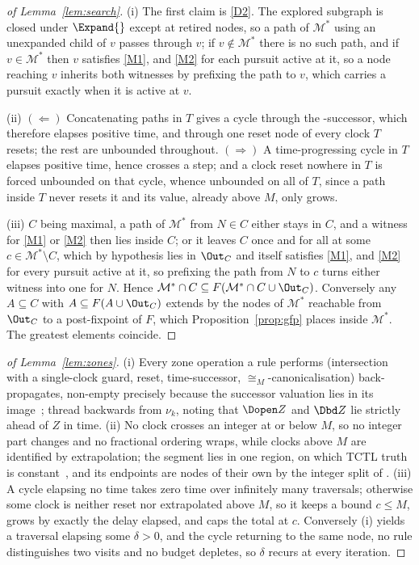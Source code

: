 \begin{proof}[of Lemma~\ref{lem:search}]
(i) The first claim is \ref{D2}. The explored subgraph is closed under $\Expand{}$ except at retired
nodes, so a path of $\mathcal M^{*}$ using an unexpanded child of $v$ passes through $v$; if
$v\notin\mathcal M^{*}$ there is no such path, and if $v\in\mathcal M^{*}$ then $v$ satisfies
\ref{M1}, and \ref{M2} for each pursuit active at it, so a node reaching $v$ inherits both witnesses
by prefixing the path to $v$, which carries a pursuit exactly when it is active at $v$.

(ii) $(\Leftarrow)$ Concatenating paths in $T$ gives a cycle through the -successor,
which therefore elapses positive time, and through one reset node of every clock $T$ resets; the rest
are unbounded throughout. $(\Rightarrow)$ A time-progressing cycle in $T$ elapses positive time,
hence crosses a  step; and a clock reset nowhere in $T$ is forced unbounded on that
cycle, whence unbounded on all of $T$, since a path inside $T$ never resets it and its value, already
above $M$, only grows.

(iii) $C$ being maximal, a path of $\mathcal M^{*}$ from $N\in C$ either stays in $C$, and a witness
for \ref{M1} or \ref{M2} then lies inside $C$; or it leaves $C$ once and for all at some
$c\in\mathcal M^{*}\setminus C$, which by hypothesis lies in $\Out_C$ and itself satisfies \ref{M1},
and \ref{M2} for every pursuit active at it, so prefixing the path from $N$ to $c$ turns either
witness into one for $N$. Hence $\mathcal M^{*}\cap C\subseteq F(\mathcal M^{*}\cap C\cup\Out_C)$.
Conversely any $A\subseteq C$ with $A\subseteq F(A\cup\Out_C)$ extends by the nodes of
$\mathcal M^{*}$ reachable from $\Out_C$ to a post-fixpoint of $F$, which Proposition~\ref{prop:gfp}
places inside $\mathcal M^{*}$. The greatest elements coincide.
\end{proof}

\begin{proof}[of Lemma~\ref{lem:zones}]
(i) Every zone operation a rule performs (intersection with a single-clock guard, reset,
time-successor, $\cong_M$-canonicalisation) back-propagates, non-empty precisely because the
successor valuation lies in its image~\cite{Bouyer05TimedAutomata}; thread backwards from $\nu_k$,
noting that $\Dopen Z$ and $\Dbd Z$ lie strictly ahead of $Z$ in time. (ii) No clock crosses an
integer at or below $M$, so no integer part changes and no fractional ordering wraps, while clocks
above $M$ are identified by extrapolation; the segment lies in one region, on which TCTL truth is
constant~\cite{AlurCourcoubetisDill1990,Bouyer05TimedAutomata}, and its endpoints are nodes of their
own by the integer split of . (iii) A cycle elapsing no time takes zero time over
infinitely many traversals; otherwise some clock is neither reset nor extrapolated above $M$, so it
keeps a bound $c\le M$, grows by exactly the delay elapsed, and caps the total at $c$. Conversely (i)
yields a traversal elapsing some $\delta>0$, and the cycle returning to the same node, no rule
distinguishes two visits and no budget depletes, so $\delta$ recurs at every iteration.
\end{proof}

